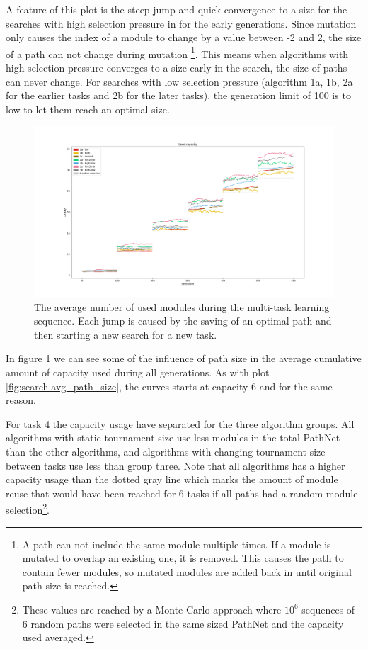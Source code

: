 A feature of this plot is the steep jump and quick convergence to a size for the searches with high selection pressure in for the early generations. Since mutation only causes the index of a module to change by a value between -2 and 2, the size of a path can not change during mutation \footnote{A path can not include the same module multiple times. If a module is mutated to overlap an existing one, it is removed. This causes the path to contain fewer modules, so mutated modules are added back in until original path size is reached.}. This means when algorithms with high selection pressure converges to a size early in the search, the size of paths can never change. For searches with low selection pressure (algorithm 1a, 1b, 2a for the earlier tasks and 2b for the later tasks), the generation limit of 100 is to low to let them reach an optimal size. 

\begin{figure}[p!]%
    \includegraphics[width=\textwidth]{Chapters/Experiments/search_algo/figures/Capacity_pr_generation.png}
    \caption{The average number of used modules during the multi-task learning sequence. Each jump is caused by the saving of an optimal path and then starting a new search for a new task. }
    \label{fig:search.capacity}
\end{figure}

In figure \ref{fig:search.capacity} we can see some of the influence of path size in the average cumulative amount of capacity used during all generations. As with plot \ref{fig:search.avg_path_size}, the curves starts at capacity 6 and for the same reason. 

For task 4 the capacity usage have separated for the three algorithm groups. All algorithms with static tournament size use less modules in the total PathNet than the other algorithms, and algorithms with changing tournament size between tasks use less than group three. Note that all algorithms has a higher capacity usage than the dotted gray line which marks the amount of module reuse that would have been reached for 6 tasks if all paths had a random module selection\footnote{These values are reached by a Monte Carlo approach where \(10^{6}\) sequences of 6 random paths were selected in the same sized PathNet and the capacity used averaged.}.

